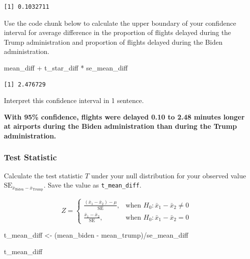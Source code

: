 \documentclass[
  letterpaper,
  DIV=11,
  numbers=noendperiod]{scrartcl}
\newenvironment{Shaded}{\begin{snugshade}}{\end{snugshade}}
\newcommand{\NormalTok}[1]{\textcolor[rgb]{0.00,0.23,0.31}{#1}}
\newcommand{\OtherTok}[1]{\textcolor[rgb]{0.00,0.23,0.31}{#1}}
\newcommand{\SpecialCharTok}[1]{\textcolor[rgb]{0.37,0.37,0.37}{#1}}
\begin{document}
\begin{verbatim}
[1] 0.1032711
\end{verbatim}

Use the code chunk below to calculate the upper boundary of your
confidence interval for average difference in the proportion of flights
delayed during the Trump administration and proportion of flights
delayed during the Biden administration.

\begin{Shaded}
\begin{Highlighting}[]
\NormalTok{mean\_diff }\SpecialCharTok{+}\NormalTok{ t\_star\_diff }\SpecialCharTok{*}\NormalTok{ se\_mean\_diff}
\end{Highlighting}
\end{Shaded}

\begin{verbatim}
[1] 2.476729
\end{verbatim}

Interpret this confidence interval in 1 sentence.

\begin{tcolorbox}[enhanced jigsaw, toprule=.15mm, breakable, leftrule=.75mm, bottomrule=.15mm, rightrule=.15mm, colback=white, opacityback=0, colframe=quarto-callout-warning-color-frame, left=2mm, arc=.35mm]

\textbf{With 95\% confidence, flights were delayed 0.10 to 2.48 minutes
longer at airports during the Biden administration than during the Trump
administration.}

\end{tcolorbox}

\subsubsection{Test Statistic}\label{test-statistic-1}

Calculate the test statistic \(T\) under your null distribution for your
observed value
\(\text{SE}_{\bar{x}_{\text{Biden}}-\bar{x}_{\text{Trump}}}\). Save the
value as \texttt{t\_mean\_diff}.

\[
Z=
\begin{cases}
\frac{(\bar{x}_1-\bar{x}_2)-\mu}{\text{SE}}, & \text{when } H_0\colon \bar{x}_1-\bar{x}_2 \ne 0 \\
\frac{\bar{x}_1-\bar{x}_2}{\text{SE}}, & \text{when } H_0\colon \bar{x}_1-\bar{x}_2 = 0
\end{cases}
\]

\begin{Shaded}
\begin{Highlighting}[]
\NormalTok{t\_mean\_diff }\OtherTok{\textless{}{-}}\NormalTok{ (mean\_biden }\SpecialCharTok{{-}}\NormalTok{ mean\_trump)}\SpecialCharTok{/}\NormalTok{se\_mean\_diff}

\NormalTok{t\_mean\_diff}
\end{Highlighting}
\end{Shaded}
\end{document}
